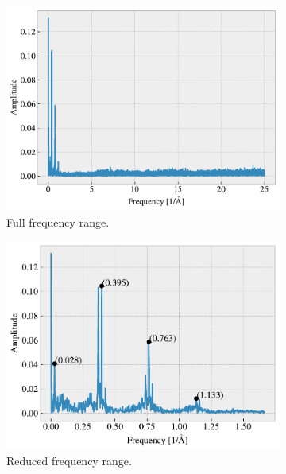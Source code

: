 \begin{figure}[H]
  \centering
  \begin{subfigure}[b]{0.49\textwidth}
      \centering
      \includegraphics[width=\textwidth]{figures/baseline/ft.pdf}
      \caption{Full frequency range.}
      \label{fig:ft_a}
  \end{subfigure}
  \hfill
  \begin{subfigure}[b]{0.49\textwidth}
      \centering
      \includegraphics[width=\textwidth]{figures/baseline/ft_zoom.pdf}
      \caption{Reduced frequency range.}
      \label{fig:ft_b}
  \end{subfigure}
  \hfill
  \begin{subfigure}[b]{0.49\textwidth}

\end{subfigure}
\end{figure}
